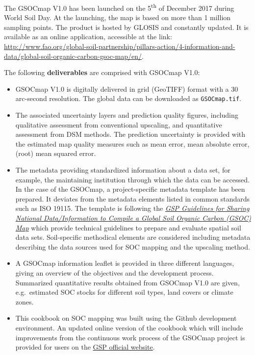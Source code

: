 \documentclass[10pt,b5paper,]{book}
\providecommand{\tightlist}{%
  \setlength{\itemsep}{0pt}\setlength{\parskip}{0pt}}
\theoremstyle{definition}
\theoremstyle{definition}
\theoremstyle{definition}
\theoremstyle{remark}
\begin{document}
The GSOCmap V1.0 has been launched on the 5\textsuperscript{th} of
December 2017 during World Soil Day. At the launching, the map is based
on more than 1 million sampling points. The product is hosted by GLOSIS
and constantly updated. It is available as an online application,
accessible at the link:
\url{http://www.fao.org/global-soil-partnership/pillars-action/4-information-and-data/global-soil-organic-carbon-gsoc-map/en/}.

The following \textbf{deliverables} are comprised with GSOCmap V1.0:

\begin{itemize}
\tightlist
\item
  GSOCmap V1.0 is digitally delivered in grid (GeoTIFF) format with a 30
  arc-second resolution. The global data can be downloaded as
  \texttt{GSOCmap.tif}.
\item
  The associated uncertainty layers and prediction quality figures,
  including qualitative assessment from conventional upscaling, and
  quantitative assessment from DSM methods. The prediction uncertainty
  is provided with the estimated map quality measures such as mean
  error, mean absolute error, (root) mean squared error.
\item
  The metadata providing standardized information about a data set, for
  example, the maintaining institution through which the data can be
  accessed. In the case of the GSOCmap, a project-specific metadata
  template has been prepared. It deviates from the metadata elements
  listed in common standards such as ISO 19115. The template is
  following the \href{http://www.fao.org/3/a-bp164e.pdf}{\emph{GSP
  Guidelines for Sharing National Data/Information to Compile a Global
  Soil Organic Carbon (GSOC) Map}} \citep{gsp_guidelines_2017} which
  provide technical guidelines to prepare and evaluate spatial soil data
  sets. Soil-specific methodical elements are considered including
  metadata describing the data sources used for SOC mapping and the
  upscaling method.
\item
  A GSOCmap information leaflet is provided in three different
  languages, giving an overview of the objectives and the development
  process. Summarized quantitative results obtained from GSOCmap V1.0
  are given, e.g.~estimated SOC stocks for different soil types, land
  covers or climate zones.
\item
  This cookbook on SOC mapping was built using the Github development
  environment. An updated online version of the cookbook which will
  include improvements from the continuous work process of the GSOCmap
  project is provided for users on the
  \href{http://www.fao.org/global-soil-partnership/pillars-action/4-information-and-data/global-soil-organic-carbon-gsoc-map/en/}{GSP
  official website}.
\end{itemize}
\end{document}
